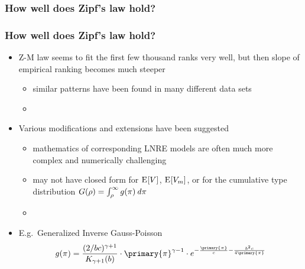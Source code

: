 \documentclass[t]{beamer} %
\begin{document}
\begin{frame}[c]
  \frametitle{How well does Zipf's law hold?} 

  \centering
\end{frame}

\begin{frame}
  \frametitle{How well does Zipf's law hold?}

  \begin{itemize}
  \item Z-M law seems to fit the first few thousand ranks very well, but then slope of empirical ranking becomes much steeper
    \begin{itemize}
    \item similar patterns have been found in many different data sets
    \item[]
    \end{itemize}
  \item<2-> Various modifications and extensions have been suggested \citep{Sichel:71,Kornai:99,Montemurro:01}
    \begin{itemize}
    \item mathematics of corresponding LNRE models are often much more complex and numerically challenging
    \item may not have closed form for $\mathrm{E}_{}[V]$, $\mathrm{E}_{}[V_m]$, or for the cumulative type distribution $G(\rho) = \int_{\rho}^{\infty} g(\pi) \,\mathit{d{\pi}}$
    \item[]
    \end{itemize}
  \item<3-> E.g.\ Generalized Inverse Gauss-Poisson \citep[GIGP;][]{Sichel:71}
    \[
      g(\pi) =
      \frac{(2 / bc)^{\gamma + 1}}{K_{\gamma+1}(b)} \cdot
      \primary{\pi}^{\gamma-1} \cdot
      e^{-\frac{\primary{\pi}}{c} - \frac{b^2 c}{4 \primary{\pi}}}
    \]
  \end{itemize}
\end{frame}
\end{document}
